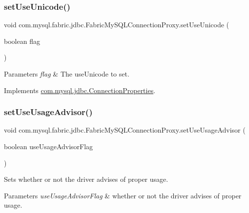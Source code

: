 \subsubsection{\texorpdfstring{set\+Use\+Unicode()}{setUseUnicode()}}
{\footnotesize\ttfamily void com.\+mysql.\+fabric.\+jdbc.\+Fabric\+My\+S\+Q\+L\+Connection\+Proxy.\+set\+Use\+Unicode (\begin{DoxyParamCaption}\item[{boolean}]{flag }\end{DoxyParamCaption})}


\begin{DoxyParams}{Parameters}
{\em flag} & The use\+Unicode to set. \\
\hline
\end{DoxyParams}


Implements \mbox{\hyperlink{interfacecom_1_1mysql_1_1jdbc_1_1_connection_properties_a2b78e87d6cfd73e15066b8bdbc0cecb0}{com.\+mysql.\+jdbc.\+Connection\+Properties}}.

\mbox{\label{classcom_1_1mysql_1_1fabric_1_1jdbc_1_1_fabric_my_s_q_l_connection_proxy_a2969efbe839484628dff587d283603ca}} 
\subsubsection{\texorpdfstring{set\+Use\+Usage\+Advisor()}{setUseUsageAdvisor()}}
{\footnotesize\ttfamily void com.\+mysql.\+fabric.\+jdbc.\+Fabric\+My\+S\+Q\+L\+Connection\+Proxy.\+set\+Use\+Usage\+Advisor (\begin{DoxyParamCaption}\item[{boolean}]{use\+Usage\+Advisor\+Flag }\end{DoxyParamCaption})}

Sets whether or not the driver advises of proper usage.


\begin{DoxyParams}{Parameters}
{\em use\+Usage\+Advisor\+Flag} & whether or not the driver advises of proper usage. \\
\hline
\end{DoxyParams}


